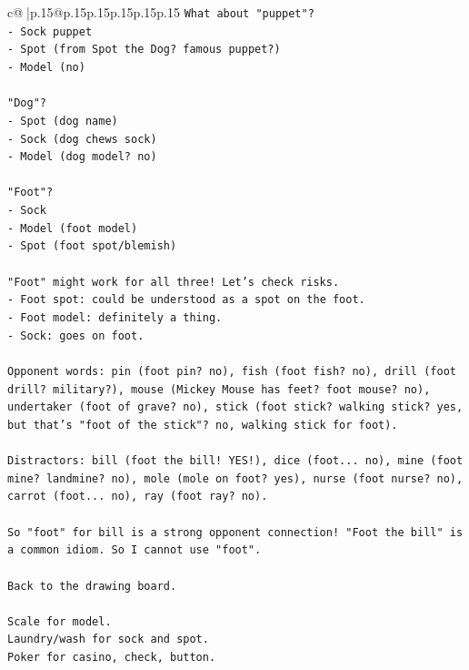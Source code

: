 \documentclass{article}
\begin{document}
{\begin{supertabular}{c@{$\;$}|p{.15\linewidth}@{}p{.15\linewidth}p{.15\linewidth}p{.15\linewidth}p{.15\linewidth}p{.15\linewidth}}
{{{\texttt{What about "puppet"?} \\
\texttt{{-} Sock puppet} \\
\texttt{{-} Spot (from Spot the Dog? famous puppet?)} \\
\texttt{{-} Model (no)} \\
\\ 
\texttt{"Dog"?} \\
\texttt{{-} Spot (dog name)} \\
\texttt{{-} Sock (dog chews sock)} \\
\texttt{{-} Model (dog model? no)} \\
\\ 
\texttt{"Foot"?} \\
\texttt{{-} Sock} \\
\texttt{{-} Model (foot model)} \\
\texttt{{-} Spot (foot spot/blemish)} \\
\\ 
\texttt{"Foot" might work for all three! Let's check risks.} \\
\texttt{{-} Foot spot: could be understood as a spot on the foot.} \\
\texttt{{-} Foot model: definitely a thing.} \\
\texttt{{-} Sock: goes on foot.} \\
\\ 
\texttt{Opponent words: pin (foot pin? no), fish (foot fish? no), drill (foot drill? military?), mouse (Mickey Mouse has feet? foot mouse? no), undertaker (foot of grave? no), stick (foot stick? walking stick? yes, but that's "foot of the stick"? no, walking stick for foot).} \\
\\ 
\texttt{Distractors: bill (foot the bill! YES!), dice (foot... no), mine (foot mine? landmine? no), mole (mole on foot? yes), nurse (foot nurse? no), carrot (foot... no), ray (foot ray? no).} \\
\\ 
\texttt{So "foot" for bill is a strong opponent connection! "Foot the bill" is a common idiom. So I cannot use "foot".} \\
\\ 
\texttt{Back to the drawing board.} \\
\\ 
\texttt{Scale for model.} \\
\texttt{Laundry/wash for sock and spot.} \\
\texttt{Poker for casino, check, button.} \\
}}}
\end{supertabular}}
\end{document}

